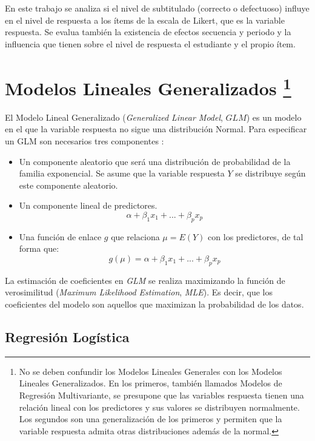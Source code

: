 \documentclass[
  12pt,
  a4paper,
  extrafontsizes,
  onecolumn,
  openright,
  table]{memoir}
\begin{document}
En este trabajo se analiza si el nivel de subtitulado (correcto o
defectuoso) influye en el nivel de respuesta a los ítems de la escala de
Likert, que es la variable respuesta. Se evalua también la existencia de
efectos secuencia y periodo y la influencia que tienen sobre el nivel de
respuesta el estudiante y el propio ítem.

\hypertarget{sec-glm}{%
\section[Modelos Lineales Generalizados ]{\texorpdfstring{Modelos
Lineales Generalizados
\footnote{No se deben confundir los Modelos Lineales Generales con los
  Modelos Lineales Generalizados. En los primeros, también llamados
  Modelos de Regresión Multivariante, se presupone que las variables
  respuesta tienen una relación lineal con los predictores y sus valores
  se distribuyen normalmente. Los segundos son una generalización de los
  primeros y permiten que la variable respuesta admita otras
  distribuciones además de la normal.}}{Modelos Lineales Generalizados }}\label{sec-glm}}

El Modelo Lineal Generalizado (\emph{Generalized Linear Model}, \(GLM\))
es un modelo en el que la variable respuesta no sigue una distribución
Normal. Para especificar un \gls{GLM} son necesarios tres componentes
\autocite[ver][pp.~66-67]{agresti_2018}:

\begin{itemize}
\item
  Un componente aleatorio que será una distribución de probabilidad de
  la familia exponencial. Se asume que la variable respuesta \(Y\) se
  distribuye según este componente aleatorio.
\item
  Un componente lineal de predictores. \[
  \alpha+\beta_1x_1+...+\beta_px_p
  \]
\item
  Una función de enlace \(g\) que relaciona \(\mu=E(Y)\) con los
  predictores, de tal forma que: \[
  g(\mu)=\alpha+\beta_1x_1+...+\beta_px_p
  \]
\end{itemize}

La estimación de coeficientes en \emph{GLM} se realiza maximizando la
función de verosimilitud (\emph{Maximum Likelihood Estimation},
\emph{\gls{MLE}}). Es decir, que los coeficientes del modelo son
aquellos que maximizan la probabilidad de los datos.

\hypertarget{sec-logistica}{%
\subsection{Regresión Logística}\label{sec-logistica}}
\end{document}
